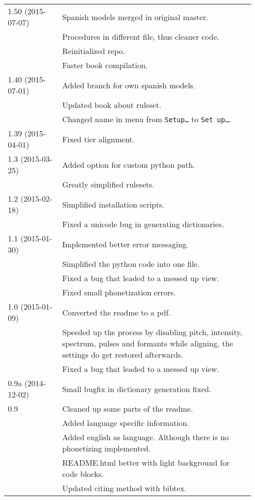 \begin{longtable}{|p{0.22\linewidth}p{0.8\linewidth}|}
	\hline
	1.50 (2015-07-07) & \tabitem Spanish models merged in original master.\\
		& \tabitem Procedures in different file, thus cleaner code.\\
		& \tabitem Reinitialized repo.\\
		& \tabitem Faster book compilation.\\
	\hline
	1.40 (2015-07-01) & \tabitem Added branch for own spanish models.\\
		& \tabitem Updated book about ruleset.\\
		& \tabitem Changed name in menu from \texttt{Setup\ldots} to 
			\texttt{Set up\dots}.\\
	\hline
	1.39 (2015-04-01) & \tabitem Fixed tier alignment.\\
	\hline
	1.3 (2015-03-25) & \tabitem Added option for custom python path.\\
	 & \tabitem Greatly simplified rulesets.\\
	\hline
	1.2 (2015-02-18) & \tabitem Simplified installation scripts.\\
		& \tabitem Fixed a unicode bug in generating dictionaries.\\
	\hline
	1.1 (2015-01-30) & \tabitem Implemented better error messaging.\\
		& \tabitem Simplified the python code into one file.\\
		& \tabitem Fixed a bug that leaded to a messed up view.\\
		& \tabitem Fixed small phonetization errors.\\
	\hline
	1.0 (2015-01-09) & \tabitem Converted the readme to a pdf.\\
		& \tabitem Speeded up the process by disabling pitch, intensity,
spectrum, pulses and formants while aligning, the settings do get restored
afterwards.\\
		& \tabitem Fixed a bug that leaded to a messed up view.\\
	\hline
	0.9a (2014-12-02) & \tabitem Small bugfix in dictionary generation fixed.\\
	\hline
	0.9 & \tabitem Cleaned up some parts of the readme.\\
		& \tabitem Added language specific information.\\
		& \tabitem Added english as language. Although there is no phonetizing
implemented.\\
		& \tabitem README.html better with light background for code blocks.\\
		& \tabitem Updated citing method with bibtex.\\

\end{longtable}
